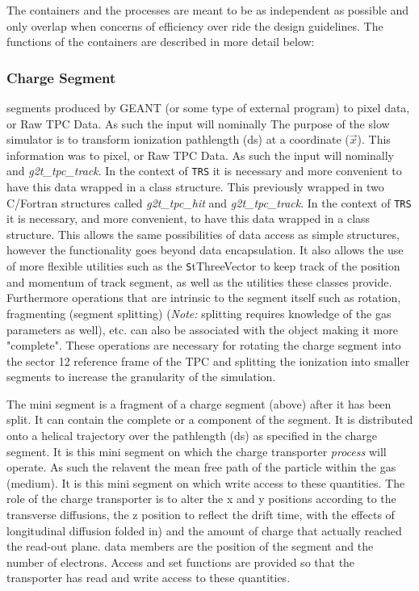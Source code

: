 \documentclass[twoside]{article}
\newcommand{\comp}[1]{\texttt{#1}}%
\begin{document}
The containers and the processes are meant to be as independent
as possible and only overlap when concerns of efficiency over ride
the design guidelines.  The functions of the containers are described
in more detail below:

\subsubsection{Charge Segment}
segments produced by GEANT (or some type of external program)
to pixel data, or Raw TPC Data.  As such the input will nominally
The purpose of the slow simulator is to transform ionization
pathlength (ds) at a coordinate ($\vec{x}$).  This information was
to pixel, or Raw TPC Data.  As such the input will nominally
and {\em g2t\_tpc\_track}.  In the context of \comp{TRS} it is necessary and
more convenient to have this data wrapped in a class structure.  This
previously wrapped in two C/Fortran structures called {\em g2t\_tpc\_hit}
and {\em g2t\_tpc\_track}.  In the context of \comp{TRS} it is necessary, and
more convenient, to have this data wrapped in a class structure.  This
allows the same possibilities of data access as simple structures, however
the functionality goes beyond data encapsulation.  It also allows the
use of more flexible utilities such as the {\texttt StThreeVector} to
keep track of the position and momentum of track segment, as well as the
utilities these classes provide.  Furthermore operations that are
intrinsic to the segment itself such as rotation, fragmenting
(segment splitting) ({\em Note:} splitting requires knowledge
of the gas parameters as well), etc. can also be associated with
the object making
it more "complete".  These operations are necessary for rotating the
charge segment into the sector 12 reference frame of the TPC and
splitting the ionization into smaller segments to increase the granularity
of the simulation.

The mini segment is a fragment of a charge segment (above) after it
has been split.  It can contain the complete or a component of the
segment.  It is distributed onto a helical trajectory over the pathlength
(ds) as specified in the charge segment.  It is this mini segment on which
the charge transporter {\em process} will operate.  As such the relavent
the mean free path of the particle within the gas (medium).  
It is this mini segment on which
write access to these quantities.  The role of the charge transporter is
to alter the x and y positions according to the transverse diffusions, the
z position to reflect the drift time, with the effects of longitudinal
diffusion folded in) and the amount of charge that actually reached the
read-out plane.
data members are the position of the segment and the number of electrons.
Access and set functions are provided so that the transporter has read and
write access to these quantities.  
\end{document}

